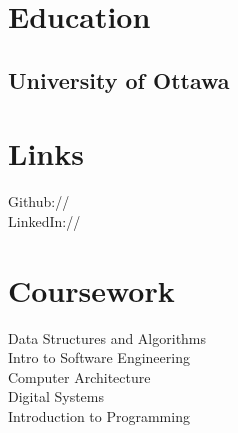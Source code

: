 \documentclass[]{resume-openfont}
\begin{document}
%
%


%
%

\begin{minipage}[t]{0.33\textwidth} 


\section{Education} 
\subsection{University of Ottawa}
\sectionsep


\section{Links} 
Github:// \href{https://https://github.com/Suri111200}{} \\
LinkedIn://  \href{https://www.linkedin.com/in/soorya-s}{} \\
\sectionsep


\section{Coursework}
Data Structures and Algorithms \\
Intro to Software Engineering \\
Computer Architecture \\
Digital Systems \\
Introduction to Programming\\
\sectionsep



\end{minipage}
\end{document}
